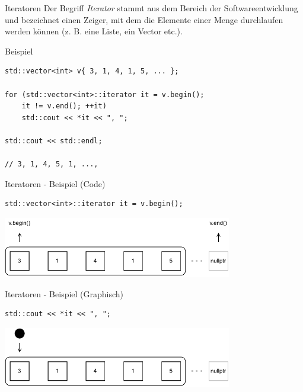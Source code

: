 \begin{frame}{Iteratoren}
    Der Begriff \emph{Iterator} stammt aus dem Bereich der Softwareentwicklung und bezeichnet einen Zeiger, mit dem die Elemente einer Menge durchlaufen werden können (z. B. eine Liste, ein Vector etc.).
\end{frame}

\begin{frame}[fragile]{Beispiel}
    \begin{verbatim}
std::vector<int> v{ 3, 1, 4, 1, 5, ... };

for (std::vector<int>::iterator it = v.begin();
    it != v.end(); ++it)
    std::cout << *it << ", ";

std::cout << std::endl;

// 3, 1, 4, 5, 1, ...,
    \end{verbatim}
\end{frame}

\begin{frame}[fragile]{Iteratoren - Beispiel (Code)}
    \begin{verbatim}
std::vector<int>::iterator it = v.begin();
    \end{verbatim}

    \begin{center}
        \includegraphics[width=0.75\textwidth]{pictures/iterators_example_1.pdf}
    \end{center}
\end{frame}

\begin{frame}[fragile]{Iteratoren - Beispiel (Graphisch)}
    \begin{verbatim}
std::cout << *it << ", ";
    \end{verbatim}

    \begin{center}
        \includegraphics[width=0.75\textwidth]{pictures/iterators_example_2.pdf}
    \end{center}
\end{frame}

